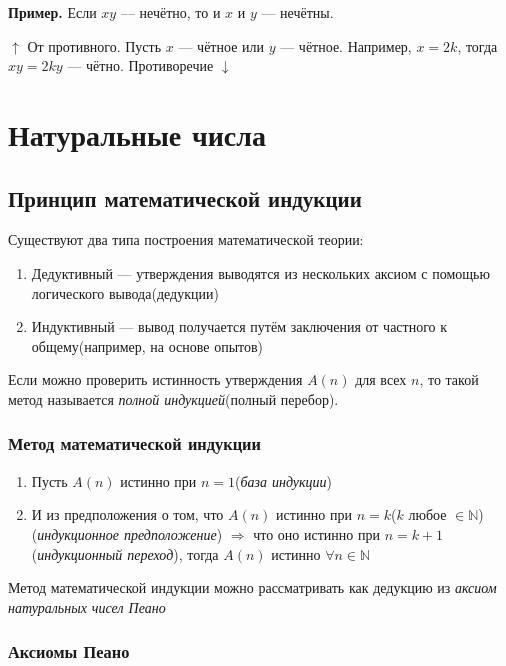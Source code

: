 \documentclass{article}
\begin{document}
    \textbf{Пример.} Если \(xy\) --- нечётно, то и \(x\) и \(y\) --- нечётны.

    \(\uparrow\) От противного. Пусть \(x\) --- чётное или \(y\) --- чётное. Например, \(x = 2k\), тогда \(xy = 2ky\) --- чётно. Противоречие \(\downarrow\)

    \section{Натуральные числа}

    \subsection{Принцип математической индукции}

    Существуют два типа построения математической теории:
    \begin{enumerate}
        \item Дедуктивный --- утверждения выводятся из нескольких аксиом с помощью логического вывода(дедукции)
        \item Индуктивный --- вывод получается путём заключения от частного к общему(например, на основе опытов)
    \end{enumerate}

    Если можно проверить истинность утверждения \(A(n)\) для всех \(n\), то такой метод называется \textit{полной индукцией}(полный перебор).

    \subsubsection{Метод математической индукции}

    \begin{enumerate}
        \item Пусть \(A(n)\) истинно при \(n=1\)(\textit{база индукции})
        \item И из предположения о том, что \(A(n)\) истинно при \(n=k\)(\(k\) любое \(\in \mathbb{N}\))(\textit{индукционное предположение}) \(\Rightarrow\) что оно истинно при \(n=k+1\)(\textit{индукционный переход}), тогда \(A(n)\) истинно \(\forall n \in \mathbb{N}\)
    \end{enumerate}

    Метод математической индукции можно рассматривать как дедукцию из \textit{аксиом натуральных чисел Пеано}

    \subsubsection{Аксиомы Пеано}
\end{document}
